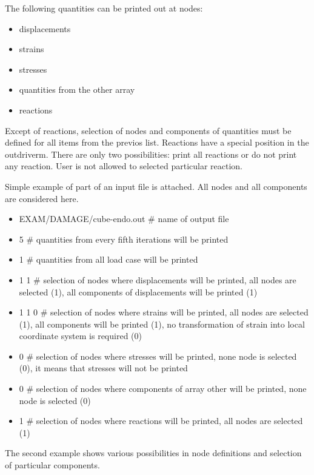 The following quantities can be printed out at nodes:
\begin{itemize}
\item displacements
\item strains
\item stresses
\item quantities from the other array
\item reactions
\end{itemize}

Except of reactions, selection of nodes and components of quantities must be defined for
all items from the previos list.
Reactions have a special position in the outdriverm. There are only two possibilities: print all
reactions or do not print any reaction. User is not allowed to selected particular reaction.

Simple example of part of an input file is attached. All nodes and all components
are considered here. 

\begin{itemize}
\item[]
EXAM/DAMAGE/cube-endo.out \# name of output file
\item[]
5 \# quantities from every fifth iterations will be printed
\item[]
1 \# quantities from all load case will be printed
\item[]
1 1 \# selection of nodes where displacements will be printed, all nodes
are selected (1), all components of displacements will be printed (1)
\item[]
1 1 0 \# selection of nodes where strains will be printed, all nodes are selected (1),
all components will be printed (1), no transformation of strain into
local coordinate system is required (0)
\item[]
0 \# selection of nodes where stresses will be printed, none node is selected (0), it means that stresses
will not be printed
\item[]
0 \# selection of nodes where components of array other will be printed, none node is selected (0)
\item[]
1 \# selection of nodes where reactions will be printed, all nodes are selected (1)
\end{itemize}

The second example shows various possibilities in node definitions and selection of particular components.

